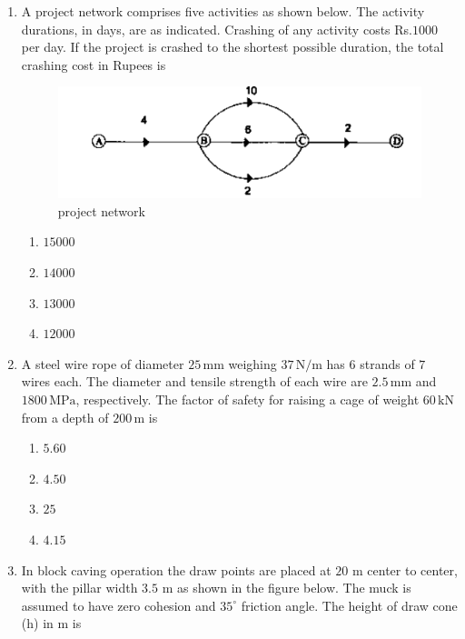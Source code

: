 \documentclass[journal,12pt,onecolumn]{IEEEtran}
\theoremstyle{remark}
\begin{document}
\begin{enumerate}
\item A project network comprises five activities as shown below. The activity durations, in days, are as
indicated. Crashing of any activity costs Rs.$1000$ per day. If the project is crashed to the shortest possible duration, the total crashing cost in Rupees is

\hfill{}
\begin{figure}[H]
  \centering
  \includegraphics[width=0.4\columnwidth]{figs/43.png}
  \caption{project network}
  \label{fig:43}
\end{figure}
\begin{multicols}{4}
\begin{enumerate}
\item $15000$
\item $14000$
\item $13000$
\item $ 12000$
\end{enumerate}
\end{multicols}

\item A steel wire rope of diameter $25\,\mathrm{mm}$ weighing $37\,\mathrm{N/m}$ has $6$ strands of $7$ wires each. 
The diameter and tensile strength of each wire are $2.5\,\mathrm{mm}$ and $1800\,\mathrm{MPa}$, respectively. The factor of safety for raising a cage of weight $60\,\mathrm{kN}$ from a depth of $200\,\mathrm{m}$ is

\hfill{}
\begin{multicols}{4}
\begin{enumerate}
\item $5.60$
\item $4.50$
\item $25$
\item $4.15$
\end{enumerate}
\end{multicols}

\item In block caving operation the draw points are placed at $20$ m center to center, with the pillar width
$3.5$ m as shown in the figure below. The muck is assumed to have zero cohesion and $35^\circ$ friction angle. The height of draw cone (h) in m is


\end{enumerate}
\end{document}
